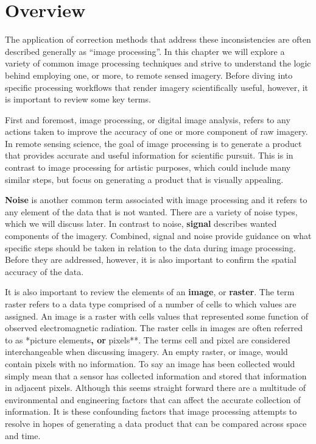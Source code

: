\documentclass[
]{book}
\begin{document}
\section{Overview}\label{overview}

The application of correction methods that address these inconsistencies are often described generally as ``image processing''. In this chapter we will explore a variety of common image processing techniques and strive to understand the logic behind employing one, or more, to remote sensed imagery. Before diving into specific processing workflows that render imagery scientifically useful, however, it is important to review some key terms.

First and foremost, image processing, or digital image analysis, refers to any actions taken to improve the accuracy of one or more component of raw imagery. In remote sensing science, the goal of image processing is to generate a product that provides accurate and useful information for scientific pursuit. This is in contrast to image processing for artistic purposes, which could include many similar steps, but focus on generating a product that is visually appealing.

\textbf{Noise} is another common term associated with image processing and it refers to any element of the data that is not wanted. There are a variety of noise types, which we will discuss later. In contrast to noise, \textbf{signal} describes wanted components of the imagery. Combined, signal and noise provide guidance on what specific steps should be taken in relation to the data during image processing. Before they are addressed, however, it is also important to confirm the spatial accuracy of the data.

It is also important to review the elements of an \textbf{image}, or \textbf{raster}. The term raster refers to a data type comprised of a number of cells to which values are assigned. An image is a raster with cells values that represented some function of observed electromagnetic radiation. The raster cells in images are often referred to as *picture elements\textbf{, or }pixels**. The terms cell and pixel are considered interchangeable when discussing imagery. An empty raster, or image, would contain pixels with no information. To say an image has been collected would simply mean that a sensor has collected information and stored that information in adjacent pixels. Although this seems straight forward there are a multitude of environmental and engineering factors that can affect the accurate collection of information. It is these confounding factors that image processing attempts to resolve in hopes of generating a data product that can be compared across space and time.
\end{document}
